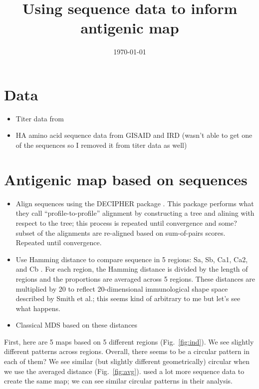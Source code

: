 \documentclass[12pt]{article}
\title{Using sequence data to inform antigenic map}
\date{\today}
\newcommand{\fref}[1]{Fig.~\ref{fig:#1}}
\begin{document}
\maketitle

\section*{Data}

\begin{itemize}
	\item Titer data from \cite{bedford2014integrating}
	\item HA amino acid sequence data from GISAID and IRD (wasn't able to get one of the sequences so I removed it from titer data as well)
\end{itemize}

\section*{Antigenic map based on sequences}

\begin{itemize}
	\item Align sequences using the DECIPHER package \citep{wright2016using}. This package performs what they call ``profile-to-profile'' alignment by constructing a tree and alining with respect to the tree; this process is repeated until convergence and some? subset of the alignments are re-aligned based on sum-of-pairs scores. Repeated until convergence.
	\item Use Hamming distance to compare sequence in 5 regions: Sa, Sb, Ca1, Ca2, and Cb \citep{anderson2018antigenic}. For each region, the Hamming distance is divided by the length of regions and the proportions are averaged across 5 regions. These distances are multiplied by 20 to reflect 20-dimensional immunological shape space described by Smith et al.; this seems kind of arbitrary to me but let's see what happens.
	\item Classical MDS based on these distances
\end{itemize}

First, here are 5 maps based on 5 different regions (\fref{ind}).
We see slightly different patterns across regions.
Overall, there seems to be a circular pattern in each of them?
We see similar (but slightly different geometrically) circular when we use the averaged distance (\fref{avg}).
\cite{anderson2018antigenic} used a lot more sequence data to create the same map; we can see similar circular patterns in their analysis.
\end{document}
